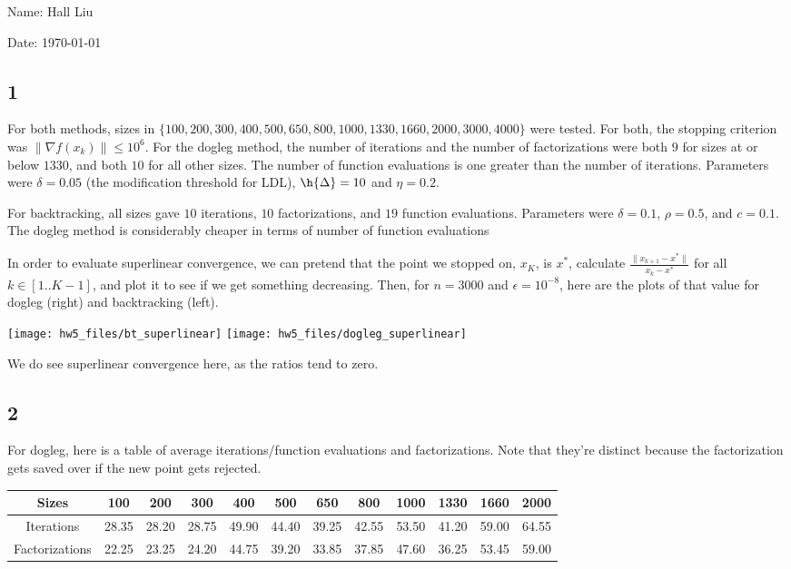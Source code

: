 \documentclass{article}
\begin{document}
Name: Hall Liu

Date: \today 
\vspace{1.5cm}
\subsection*{1}
For both methods, sizes in $\{100, 200, 300, 400, 500, 650, 800, 1000, 1330, 1660, 2000, 3000, 4000\}$ were tested. For both, the stopping criterion was $\|\nabla f(x_k)\|\leq 10^6$. For the dogleg method, the number of iterations and the number of factorizations were  both $9$ for sizes at or below $1330$, and both $10$ for all other sizes. The number of function evaluations is one greater than the number of iterations. Parameters were $\delta=0.05$ (the modification threshold for LDL), $\h{\Delta}=10$ and $\eta=0.2$.

For backtracking, all sizes gave $10$ iterations, $10$ factorizations, and $19$ function evaluations. Parameters were $\delta=0.1$, $\rho=0.5$, and $c=0.1$. The dogleg method is considerably cheaper in terms of number of function evaluations

In order to evaluate superlinear convergence, we can pretend that the point we stopped on, $x_K$, is $x^*$, calculate $\frac{\|x_{k+1}-x^*\|}{x_k-x^*}$ for all $k\in[1..K-1]$, and plot it to see if we get something decreasing. Then, for $n=3000$ and $\epsilon=10^{-8}$, here are the plots of that value for dogleg (right) and backtracking (left).

\texttt{[image: hw5\_files/bt\_superlinear]}
\texttt{[image: hw5\_files/dogleg\_superlinear]}

We do see superlinear convergence here, as the ratios tend to zero.
\subsection*{2}
For dogleg, here is a table of average iterations/function evaluations and factorizations. Note that they're distinct because the factorization gets saved over if the new point gets rejected.

\begin{tabular}{c|ccccccccccc}
    Sizes&100&200&300&400&500&650&800&1000&1330&1660&2000\\
    \hline
    Iterations&28.35&28.20&28.75&49.90&44.40&39.25&42.55&53.50&41.20&59.00&64.55\\
    Factorizations&22.25&23.25&24.20&44.75&39.20&33.85&37.85&47.60&36.25&53.45&59.00\\
\end{tabular}
\end{document}
